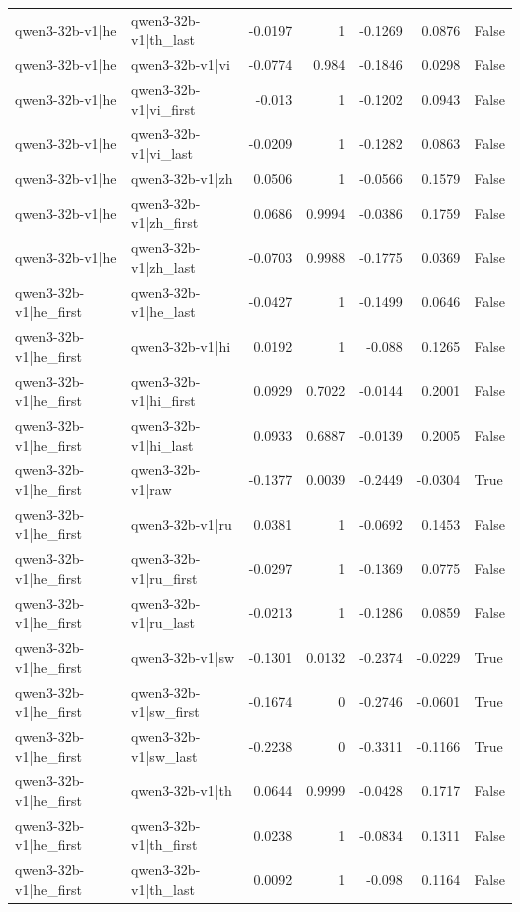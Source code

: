 \begin{table}
\begin{tabular}{l l r r r r l}
qwen3-32b-v1|he & qwen3-32b-v1|th_last & -0.0197 & 1 & -0.1269 & 0.0876 & False \\
qwen3-32b-v1|he & qwen3-32b-v1|vi & -0.0774 & 0.984 & -0.1846 & 0.0298 & False \\
qwen3-32b-v1|he & qwen3-32b-v1|vi_first & -0.013 & 1 & -0.1202 & 0.0943 & False \\
qwen3-32b-v1|he & qwen3-32b-v1|vi_last & -0.0209 & 1 & -0.1282 & 0.0863 & False \\
qwen3-32b-v1|he & qwen3-32b-v1|zh & 0.0506 & 1 & -0.0566 & 0.1579 & False \\
qwen3-32b-v1|he & qwen3-32b-v1|zh_first & 0.0686 & 0.9994 & -0.0386 & 0.1759 & False \\
qwen3-32b-v1|he & qwen3-32b-v1|zh_last & -0.0703 & 0.9988 & -0.1775 & 0.0369 & False \\
qwen3-32b-v1|he_first & qwen3-32b-v1|he_last & -0.0427 & 1 & -0.1499 & 0.0646 & False \\
qwen3-32b-v1|he_first & qwen3-32b-v1|hi & 0.0192 & 1 & -0.088 & 0.1265 & False \\
qwen3-32b-v1|he_first & qwen3-32b-v1|hi_first & 0.0929 & 0.7022 & -0.0144 & 0.2001 & False \\
qwen3-32b-v1|he_first & qwen3-32b-v1|hi_last & 0.0933 & 0.6887 & -0.0139 & 0.2005 & False \\
qwen3-32b-v1|he_first & qwen3-32b-v1|raw & -0.1377 & 0.0039 & -0.2449 & -0.0304 & True \\
qwen3-32b-v1|he_first & qwen3-32b-v1|ru & 0.0381 & 1 & -0.0692 & 0.1453 & False \\
qwen3-32b-v1|he_first & qwen3-32b-v1|ru_first & -0.0297 & 1 & -0.1369 & 0.0775 & False \\
qwen3-32b-v1|he_first & qwen3-32b-v1|ru_last & -0.0213 & 1 & -0.1286 & 0.0859 & False \\
qwen3-32b-v1|he_first & qwen3-32b-v1|sw & -0.1301 & 0.0132 & -0.2374 & -0.0229 & True \\
qwen3-32b-v1|he_first & qwen3-32b-v1|sw_first & -0.1674 & 0 & -0.2746 & -0.0601 & True \\
qwen3-32b-v1|he_first & qwen3-32b-v1|sw_last & -0.2238 & 0 & -0.3311 & -0.1166 & True \\
qwen3-32b-v1|he_first & qwen3-32b-v1|th & 0.0644 & 0.9999 & -0.0428 & 0.1717 & False \\
qwen3-32b-v1|he_first & qwen3-32b-v1|th_first & 0.0238 & 1 & -0.0834 & 0.1311 & False \\
qwen3-32b-v1|he_first & qwen3-32b-v1|th_last & 0.0092 & 1 & -0.098 & 0.1164 & False \\

\end{tabular}
\end{table}
